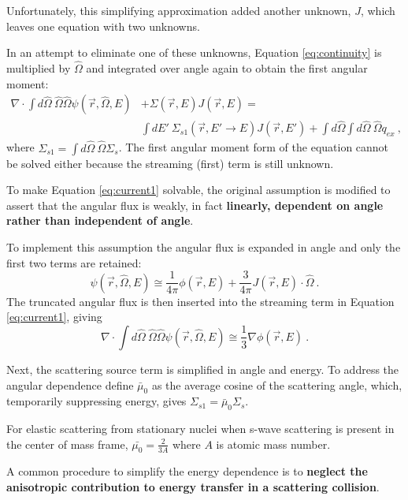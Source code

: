 \documentclass[12pt]{article}
\newcommand{\Macro}{\ensuremath{\Sigma}}
\newcommand{\vOmega}{\ensuremath{\hat{\Omega}}}
\begin{document}
Unfortunately, this simplifying approximation added another unknown, $J$, which leaves one equation with two unknowns. 

In an attempt to eliminate one of these unknowns, Equation \eqref{eq:continuity} is multiplied by $\hat{\Omega}$ and integrated over angle again to obtain the first angular moment:
%
\begin{align}
  \nabla \cdot \int  d\vOmega \:\vOmega \vOmega \psi(\vec{r}, \vOmega, E) &+ \Macro(\vec{r},E) J(\vec{r},E)= \nonumber \\
  &\int dE' \:\Macro_{s1}(\vec{r}, E' \to E)J(\vec{r},E') + \int d\vOmega \int d\vOmega \:\vOmega q_{ex} \:,
  \label{eq:current1}
\end{align}
%
where $\Macro_{s1}  = \int d\vOmega \:\vOmega \Macro_{s}$. The first angular moment form of the equation cannot be solved either because the streaming (first) term is still unknown. 

To make Equation \eqref{eq:current1} solvable, the original assumption is modified to assert that the angular flux is weakly, in fact \textbf{linearly, dependent on angle rather than independent of angle}.

To implement this assumption the angular flux is expanded in angle and only the first two terms are retained:  
%
\begin{equation}
  \psi(\vec{r}, \vOmega, E) \cong \frac{1}{4 \pi} \phi(\vec{r}, E) + \frac{3}{4 \pi}J(\vec{r}, E) \cdot \vOmega \:.
  \label{eq:angExpand} 
\end{equation}
The truncated angular flux is then inserted into the streaming term in Equation \eqref{eq:current1}, giving 
%
\begin{equation}
  \nabla \cdot \int d \vOmega \:\vOmega \vOmega \psi(\vec{r}, \vOmega, E)  \cong \frac{1}{3} \nabla \phi(\vec{r}, E) \:. 
  \label{eq:firstTerm}
\end{equation}

Next, the scattering source term is simplified in angle and energy. To address the angular dependence define $\bar{\mu}_{0}$ as the average cosine of the scattering angle, which, temporarily suppressing energy, gives $\Macro_{s1} = \bar{\mu}_{0}\Macro_{s}$. 

For elastic scattering from stationary nuclei when s-wave scattering is present in the center of mass frame, $\bar{\mu_{0}} = \frac{2}{3A}$ where $A$ is atomic mass number. 

A common procedure to simplify the energy dependence is to \textbf{neglect the anisotropic contribution to energy transfer in a scattering collision}.
\end{document}
